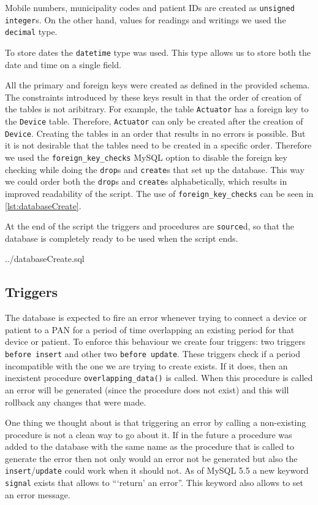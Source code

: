 \documentclass[a4paper,11pt]{article}
\begin{document}
Mobile numbers, municipality codes and patient IDs are created as \texttt{unsigned integer}s. On the other hand, values for readings and writings we used the \texttt{decimal} type.

To store dates the \texttt{datetime} type was used. This type allows us to store both the date and time on a single field.

All the primary and foreign keys were created as defined in the provided schema. The constraints introduced by these keys result in that the order of creation of the tables is not aribitrary. For example, the table \texttt{Actuator} has a foreign key to the \texttt{Device} table. Therefore, \texttt{Actuator} can only be created after the creation of \texttt{Device}. Creating the tables in an order that results in no errors is possible. But it is not desirable that the tables need to be created in a specific order. Therefore we used the \texttt{foreign\_key\_checks} MySQL option to disable the foreign key checking while doing the \texttt{drop}s and \texttt{create}s that set up the database. This way we could order both the \texttt{drop}s and \texttt{create}s alphabetically, which results in improved readability of the script. The use of \texttt{foreign\_key\_checks} can be seen in \autoref{lst:databaseCreate}.

At the end of the script the triggers and procedures are \texttt{source}d, so that the database is completely ready to be used when the script ends.



{../databaseCreate.sql}

\subsection{Triggers}

The database is expected to fire an error whenever trying to connect a device or patient to a PAN for a period of time overlapping an existing period for that device or patient. To enforce this behaviour we create four triggers: two triggers \texttt{before insert} and other two \texttt{before update}. These triggers check if a period incompatible with the one we are trying to create exists. If it does, then an inexistent procedure \texttt{overlapping\_data()} is called. When this procedure is called an error will be generated (since the procedure does not exist) and this will rollback any changes that were made. 

One thing we thought about is that triggering an error by calling a non-existing procedure is not a clean way to go about it. If in the future a procedure was added to the database with the same name as the procedure that is called to generate the error then not only would an error not be generated but also the \texttt{insert}/\texttt{update} could work when it should not. As of MySQL 5.5 a new keyword \texttt{signal} exists that allows to ``\thinspace`return' an error''. This keyword also allows to set an error message.
\end{document}
